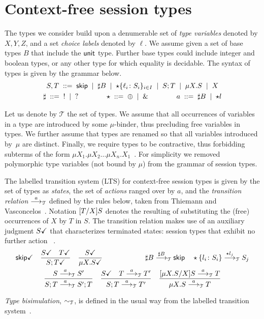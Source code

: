 \section{Context-free session types}
\label{sec:contextfreesession}

The types we consider build upon a denumerable set of \emph{type
  variables} denoted by $X,Y,Z$, and a set \emph{choice labels}
denoted by $\ell$. We assume given a set of base types $B$ that
include the $\unitk$ type. Further base types could include integer
and boolean types, or any other type for which equality is
decidable. The syntax of types is given by the grammar below.
%
\begin{gather*}
  S,T \grmeq \skipk \grmor \sharp B \grmor 
  \star\{\ell_i\colon S_i\}_{i\in I} \grmor S;T \grmor \mu X.S \grmor X
  \\
  \sharp \grmeq {}! \grmor {}? 
  \qquad \qquad
  \star  \grmeq \oplus \grmor {}\&
  \qquad \qquad
  a \grmeq \sharp B \grmor \star l %
\end{gather*}

Let us denote by $\mathcal{T}$ the set of types.
We assume that all occurrences of variables in a type are introduced
by some $\mu$-binder, thus precluding free variables in types.
%
We further assume that types are renamed so that all variables
introduced by~$\mu$ are distinct.
%
Finally, we require types to be contractive, thus forbidding subterms
of the form
$\mu X_1.\mu X_2 \dots \mu
X_n. X_1$~\cite{DBLP:journals/tcs/Courcelle83,thiemann2016context}.
%
For simplicity we removed polymorphic type variables (not bound by
$\mu$) from the grammar of session types.

The labelled transition system (LTS) for context-free session types is
given by the set of types as \emph{states}, the set of \emph{actions}
ranged over by $a$, and the \emph{transition relation} $\LTSderives$
defined by the rules below, taken from Thiemann and
Vasconcelos~\cite{thiemann2016context}.  Notation $\subs{T}{X}S$
denotes the resulting of substituting the (free) occurrences of $X$ by
$T$ in $S$. The transition relation makes use of an auxiliary judgment
$\DONE{S}$ that characterizes terminated states: session types that
exhibit no further action~\cite{DBLP:journals/jacm/AcetoH92} .
%
\begin{gather*}
  \DONE{\skipk}
  \quad
  \frac{\DONE{S} \quad \DONE{T}}{\DONE{S; T}}
  \quad
  \frac{\DONE S}{\DONE{\mu X.S}}
  \qquad \qquad \qquad
  \sharp B \LTSderives[\sharp B] \skipk
  \quad
  \star\{l_i\colon S_i\} \LTSderives[\star l_j] S_j
  \\
  \frac{S \LTSderives S'}{S; T \LTSderives S';T}
  \quad
  \frac{\DONE{S} \quad T \LTSderives T'}{S; T \LTSderives T'}
  \quad
  \frac{\subs{\mu X.S}{X}S \LTSderives T}{\mu X.S \LTSderives T}
\end{gather*}

\emph{Type bisimulation}, $\TypeEquiv$, is defined in the usual way from the
labelled transition system~\cite{sangiorgi2014introduction}.
\
